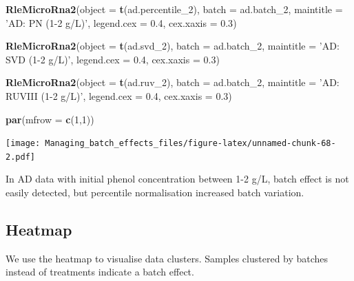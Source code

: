 \documentclass[]{book}
\newenvironment{Shaded}{\begin{snugshade}}{\end{snugshade}}
\newcommand{\KeywordTok}[1]{\textcolor[rgb]{0.13,0.29,0.53}{\textbf{#1}}}
\newcommand{\DataTypeTok}[1]{\textcolor[rgb]{0.13,0.29,0.53}{#1}}
\newcommand{\DecValTok}[1]{\textcolor[rgb]{0.00,0.00,0.81}{#1}}
\newcommand{\FloatTok}[1]{\textcolor[rgb]{0.00,0.00,0.81}{#1}}
\newcommand{\StringTok}[1]{\textcolor[rgb]{0.31,0.60,0.02}{#1}}
\newcommand{\NormalTok}[1]{#1}
\begin{document}
\begin{Shaded}
\begin{Highlighting}[]
\KeywordTok{RleMicroRna2}\NormalTok{(}\DataTypeTok{object =} \KeywordTok{t}\NormalTok{(ad.percentile_}\DecValTok{2}\NormalTok{), }\DataTypeTok{batch =}\NormalTok{ ad.batch_}\DecValTok{2}\NormalTok{, }
             \DataTypeTok{maintitle =} \StringTok{'AD: PN (1-2 g/L)'}\NormalTok{, }\DataTypeTok{legend.cex =} \FloatTok{0.4}\NormalTok{, }
             \DataTypeTok{cex.xaxis =} \FloatTok{0.3}\NormalTok{)}

\KeywordTok{RleMicroRna2}\NormalTok{(}\DataTypeTok{object =} \KeywordTok{t}\NormalTok{(ad.svd_}\DecValTok{2}\NormalTok{), }\DataTypeTok{batch =}\NormalTok{ ad.batch_}\DecValTok{2}\NormalTok{, }
             \DataTypeTok{maintitle =} \StringTok{'AD: SVD (1-2 g/L)'}\NormalTok{, }\DataTypeTok{legend.cex =} \FloatTok{0.4}\NormalTok{, }
             \DataTypeTok{cex.xaxis =} \FloatTok{0.3}\NormalTok{)}

\KeywordTok{RleMicroRna2}\NormalTok{(}\DataTypeTok{object =} \KeywordTok{t}\NormalTok{(ad.ruv_}\DecValTok{2}\NormalTok{), }\DataTypeTok{batch =}\NormalTok{ ad.batch_}\DecValTok{2}\NormalTok{, }
             \DataTypeTok{maintitle =} \StringTok{'AD: RUVIII (1-2 g/L)'}\NormalTok{, }\DataTypeTok{legend.cex =} \FloatTok{0.4}\NormalTok{, }
             \DataTypeTok{cex.xaxis =} \FloatTok{0.3}\NormalTok{)}

\KeywordTok{par}\NormalTok{(}\DataTypeTok{mfrow =} \KeywordTok{c}\NormalTok{(}\DecValTok{1}\NormalTok{,}\DecValTok{1}\NormalTok{))}
\end{Highlighting}
\end{Shaded}

\texttt{[image: Managing\_batch\_effects\_files/figure-latex/unnamed-chunk-68-2.pdf]}

In AD data with initial phenol concentration between 1-2 g/L, batch
effect is not easily detected, but percentile normalisation increased
batch variation.

\subsection{Heatmap}\label{heatmap-1}

We use the heatmap to visualise data clusters. Samples clustered by
batches instead of treatments indicate a batch effect.
\end{document}
